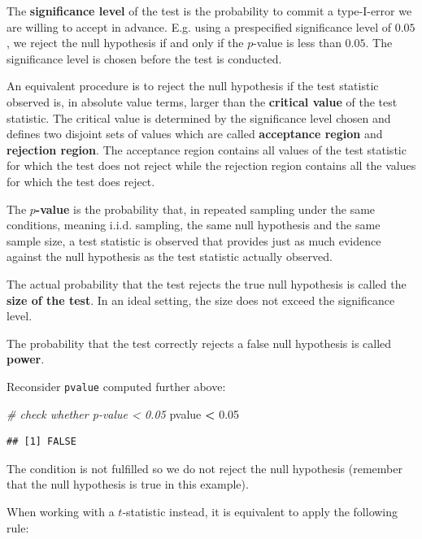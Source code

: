 \documentclass[]{book}
\newenvironment{Shaded}{\begin{snugshade}}{\end{snugshade}}
\newcommand{\FloatTok}[1]{\textcolor[rgb]{0.00,0.00,0.81}{#1}}
\newcommand{\StringTok}[1]{\textcolor[rgb]{0.31,0.60,0.02}{#1}}
\newcommand{\CommentTok}[1]{\textcolor[rgb]{0.56,0.35,0.01}{\textit{#1}}}
\newcommand{\OperatorTok}[1]{\textcolor[rgb]{0.81,0.36,0.00}{\textbf{#1}}}
\newcommand{\NormalTok}[1]{#1}
\theoremstyle{definition}
\theoremstyle{definition}
\theoremstyle{definition}
\theoremstyle{remark}
\begin{document}
The \textbf{significance level} of the test is the probability to commit
a type-I-error we are willing to accept in advance. E.g. using a
prespecified significance level of \(0.05\), we reject the null
hypothesis if and only if the \(p\)-value is less than \(0.05\). The
significance level is chosen before the test is conducted.

An equivalent procedure is to reject the null hypothesis if the test
statistic observed is, in absolute value terms, larger than the
\textbf{critical value} of the test statistic. The critical value is
determined by the significance level chosen and defines two disjoint
sets of values which are called \textbf{acceptance region} and
\textbf{rejection region}. The acceptance region contains all values of
the test statistic for which the test does not reject while the
rejection region contains all the values for which the test does reject.

The \textbf{\(p\)-value} is the probability that, in repeated sampling
under the same conditions, meaning i.i.d. sampling, the same null
hypothesis and the same sample size, a test statistic is observed that
provides just as much evidence against the null hypothesis as the test
statistic actually observed.

The actual probability that the test rejects the true null hypothesis is
called the \textbf{size of the test}. In an ideal setting, the size does
not exceed the significance level.

The probability that the test correctly rejects a false null hypothesis
is called \textbf{power}.

Reconsider \texttt{pvalue} computed further above:

\begin{Shaded}
\begin{Highlighting}[]
\CommentTok{# check whether p-value < 0.05}
\NormalTok{pvalue }\OperatorTok{<}\StringTok{ }\FloatTok{0.05}
\end{Highlighting}
\end{Shaded}

\begin{verbatim}
## [1] FALSE
\end{verbatim}

The condition is not fulfilled so we do not reject the null hypothesis
(remember that the null hypothesis is true in this example).

When working with a \(t\)-statistic instead, it is equivalent to apply
the following rule:
\end{document}
